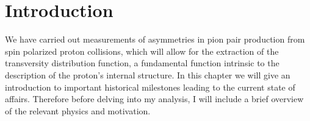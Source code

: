 \documentclass[letterpaper, abstract = on,listof=totoc, bibliography=totoc]{scrreprt}
\begin{document}



\chapter{Introduction}

We have carried out measurements of asymmetries in pion pair production from spin polarized proton collisions, which will allow for the extraction of the transversity distribution function, a fundamental function intrinsic to the description of the proton's internal structure. In this chapter we will give an introduction to important historical milestones leading to the current state of affairs. Therefore before delving into my analysis, I will include a brief overview of the relevant physics and motivation. 
\end{document}
